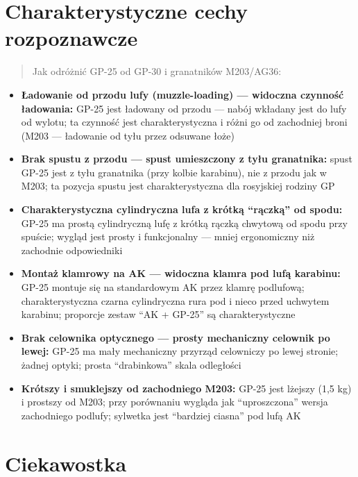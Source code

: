 \documentclass[12pt,openany,oneside]{book}
\providecommand{\tightlist}{%
  \setlength{\itemsep}{0pt}\setlength{\parskip}{0pt}}
\begin{document}
\section{Charakterystyczne cechy
rozpoznawcze}\label{charakterystyczne-cechy-rozpoznawcze-79}

\begin{quote}
Jak odróżnić GP-25 od GP-30 i granatników M203/AG36:
\end{quote}

\begin{itemize}
\tightlist
\item
  \textbf{Ładowanie od przodu lufy (muzzle-loading) --- widoczna
  czynność ładowania:} GP-25 jest ładowany od przodu --- nabój wkładany
  jest do lufy od wylotu; ta czynność jest charakterystyczna i różni go
  od zachodniej broni (M203 --- ładowanie od tyłu przez odsuwane łoże)
\item
  \textbf{Brak spustu z przodu --- spust umieszczony z tyłu granatnika:}
  spust GP-25 jest z tyłu granatnika (przy kolbie karabinu), nie z
  przodu jak w M203; ta pozycja spustu jest charakterystyczna dla
  rosyjskiej rodziny GP
\item
  \textbf{Charakterystyczna cylindryczna lufa z krótką ``rączką'' od
  spodu:} GP-25 ma prostą cylindryczną lufę z krótką rączką chwytową od
  spodu przy spuście; wygląd jest prosty i funkcjonalny --- mniej
  ergonomiczny niż zachodnie odpowiedniki
\item
  \textbf{Montaż klamrowy na AK --- widoczna klamra pod lufą karabinu:}
  GP-25 montuje się na standardowym AK przez klamrę podlufową;
  charakterystyczna czarna cylindryczna rura pod i nieco przed uchwytem
  karabinu; proporcje zestaw ``AK + GP-25'' są charakterystyczne
\item
  \textbf{Brak celownika optycznego --- prosty mechaniczny celownik po
  lewej:} GP-25 ma mały mechaniczny przyrząd celowniczy po lewej
  stronie; żadnej optyki; prosta ``drabinkowa'' skala odległości
\item
  \textbf{Krótszy i smuklejszy od zachodniego M203:} GP-25 jest lżejszy
  (1,5 kg) i prostszy od M203; przy porównaniu wygląda jak
  ``uproszczona'' wersja zachodniego podlufy; sylwetka jest ``bardziej
  ciasna'' pod lufą AK
\end{itemize}

\section{Ciekawostka}\label{ciekawostka-79}
\end{document}
